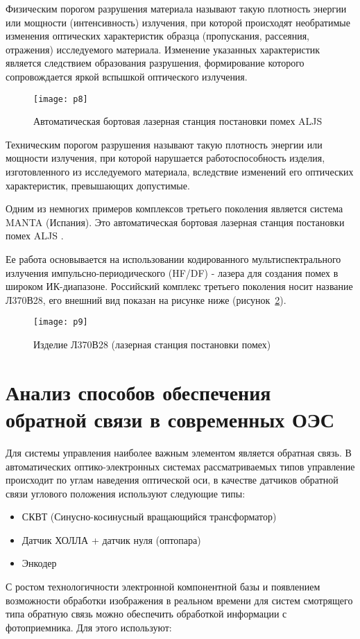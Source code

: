 Физическим порогом разрушения материала называют такую плотность энергии или мощности (интенсивность) излучения, при которой происходят необратимые изменения оптических характеристик образца (пропускания, рассеяния, отражения) исследуемого материала. Изменение указанных характеристик является следствием образования разрушения, формирование которого сопровождается яркой вспышкой оптического излучения. 

\begin{figure}[ht]
	\centering
	\texttt{[image: p8]} 
	\caption{Автоматическая бортовая лазерная станция постановки помех ALJS}
	\label{fig:p8}
\end{figure}

Техническим порогом разрушения называют такую плотность энергии или мощности излучения, при которой нарушается работоспособность изделия, изготовленного из исследуемого материала, вследствие изменений его оптических характеристик, превышающих допустимые.

Одним из немногих примеров комплексов третьего поколения является система MANTA (Испания). Это автоматическая бортовая лазерная станция постановки помех ALJS \cite[]{manta}.

Ее работа основывается на использовании кодированного мультиспектрального излучения импульсно-периодического (HF/DF) - лазера для создания помех в широком ИК-диапазоне.
Российский комплекс третьего поколения носит название Л370В28, его внешний вид показан на рисунке ниже (рисунок~\ref{fig:p9}). 

\begin{figure}[ht]
	\centering
	\texttt{[image: p9]} 
	\caption{Изделие Л370В28 (лазерная станция постановки помех)}
	\label{fig:p9}
\end{figure}

\section{Анализ способов обеспечения обратной связи в современных ОЭС} \label{sec:ch1/sec3-}

Для системы управления наиболее важным элементом является обратная связь. В автоматических оптико-электронных системах рассматриваемых типов управление происходит по углам наведения оптической оси, в качестве датчиков обратной связи углового положения используют следующие типы:
\begin{itemize}
	\item СКВТ (Синусно-косинусный вращающийся трансформатор)
	\item Датчик ХОЛЛА + датчик нуля (оптопара)
	\item Энкодер
\end{itemize}
С ростом технологичности электронной компонентной базы и появлением возможности обработки изображения в реальном времени для систем смотрящего типа обратную связь можно обеспечить обработкой информации с фотоприемника. Для этого используют:

